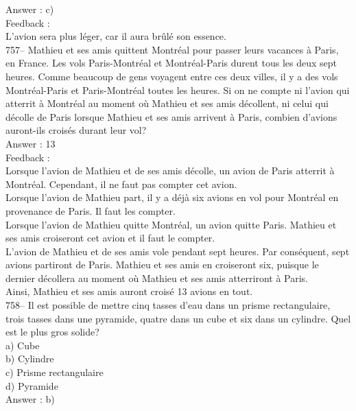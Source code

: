 \documentclass[letterpaper, 12pt]{article}
\begin{document}
Answer : c)\\

Feedback : \\
L'avion sera plus l\'eger, car il aura br\^ul\'e son essence.\\

757-- Mathieu et ses amis quittent Montr\'eal pour passer leurs vacances \`a
Paris, en France.  Les vols Paris-Montr\'eal et Montr\'eal-Paris durent tous
les deux sept heures.  Comme beaucoup de gens voyagent entre ces deux
villes, il y a des vols Montr\'eal-Paris et Paris-Montr\'eal toutes les
heures.  Si on ne compte ni l'avion qui atterrit \`a Montr\'eal au moment
o\`u Mathieu et ses amis d\'ecollent, ni celui qui d\'ecolle de Paris
lorsque Mathieu et ses amis arrivent \`a Paris, combien d'avions auront-ils
crois\'es durant leur vol?\\

Answer : 13\\

Feedback : \\
Lorsque l'avion de Mathieu et de ses amis d\'ecolle, un avion de Paris
atterrit \`a Montr\'eal. Cependant, il ne faut pas compter cet avion.\\
Lorsque l'avion de Mathieu part, il y a d\'ej\`a six avions en vol pour
Montr\'eal en provenance de Paris.  Il faut les compter.\\
Lorsque l'avion de Mathieu quitte Montr\'eal, un avion quitte Paris.
Mathieu et ses amis croiseront cet avion et il faut le compter.\\
L'avion de Mathieu et de ses amis vole pendant sept heures.  Par
cons\'equent, sept avions partiront de Paris.  Mathieu et ses amis en
croiseront six, puisque le dernier d\'ecollera au moment o\`u Mathieu et ses
amis atterriront \`a Paris.\\
Ainsi, Mathieu et ses amis auront crois\'e 13 avions en tout.  \\

758-- Il est possible de mettre cinq tasses d'eau dans un prisme
rectangulaire, trois tasses dans une pyramide, quatre dans un cube et six
dans un cylindre.  Quel est le plus gros solide?\\
a) Cube\\
b) Cylindre\\
c) Prisme rectangulaire\\
d) Pyramide\\

Answer : b)\\
\end{document}
